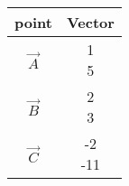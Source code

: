 \begin{tabular}[12pt]{|c|c|}
     \hline
     {point} & {Vector}\\
     \hline
     $\vec{A}$ & \myvec{1\\5}\\
     \hline
     $\vec{B}$ & \myvec{2\\3}\\
     \hline
     $\vec{C}$ & \myvec{-2\\-11}\\
     \hline
     
\end{tabular}
